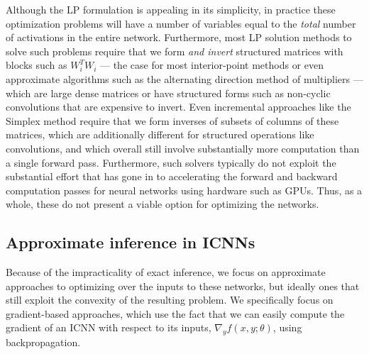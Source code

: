 Although the LP formulation is appealing in its simplicity, in practice these
optimization problems will have a number of variables equal to the \emph{total}
number of activations in the entire network.  Furthermore, most LP solution
methods to solve such problems require that we form \emph{and invert}
structured matrices with blocks such as $W_i^T W_i$
--- the case for most interior-point methods \citep{wright1997primal} or
even approximate algorithms such as the
alternating direction method of multipliers \citep{boyd2011distributed} ---
which are large dense matrices or have structured forms such as
non-cyclic convolutions that are expensive to invert.
Even incremental approaches like the Simplex method
require that we form inverses of subsets of columns of these matrices, which are
additionally different for structured operations like convolutions, and which
overall still involve substantially more computation than a single forward pass.
Furthermore, such solvers typically do not exploit the substantial effort that
has gone in to accelerating the forward and backward computation passes for
neural networks using hardware such as GPUs.  Thus, as a whole, these do not
present a viable option for optimizing the networks.


\subsection{Approximate inference in ICNNs}
Because of the impracticality of exact inference, we focus on approximate
approaches to optimizing over the inputs to these networks, but ideally ones
that still exploit the convexity of the resulting problem.  We
specifically focus on gradient-based approaches, which use the fact that we can
easily compute the gradient of an ICNN with respect to its inputs, $\nabla_y f
(x,y;\theta)$, using backpropagation.

